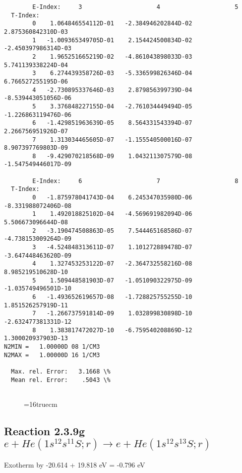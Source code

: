 \documentclass[12pt,dvipdfmx]{article}
\begin{document}
{\begin{small}
\begin{verbatim}
        E-Index:     3                     4                     5
  T-Index:
        0    1.064846554112D-01   -2.384946202844D-02    2.875360842310D-03
        1   -1.009365349705D-01    2.154424500834D-02   -2.450397986314D-03
        2    1.965251665219D-02   -4.861043898033D-03    5.741139338224D-04
        3    6.274439358726D-03   -5.336599826346D-04    6.766527255195D-06
        4   -2.730895337646D-03    2.879856399739D-04   -8.539443051056D-06
        5    3.376848227155D-04   -2.761034449494D-05   -1.226863119476D-06
        6   -1.429851963639D-05    8.564331543394D-07    2.266756951926D-07
        7    1.313034465605D-07   -1.155540500016D-07    8.907397769803D-09
        8   -9.429070218568D-09    1.043211307579D-08   -1.547549446017D-09

        E-Index:     6                     7                     8
  T-Index:
        0   -1.875978041743D-04    6.245347035980D-06   -8.331988072406D-08
        1    1.492018825102D-04   -4.569691982094D-06    5.506673096644D-08
        2   -3.190474508863D-05    7.544465168586D-07   -4.738153009264D-09
        3   -4.524848313611D-07    1.101272889478D-07   -3.647448463620D-09
        4    1.327453253122D-07   -2.364732558216D-08    8.985219510628D-10
        5    1.509448581903D-07   -1.051090322975D-09   -1.035749496501D-10
        6   -1.493652619657D-08   -1.728825755255D-10    1.851526257919D-11
        7   -1.266737591814D-09    1.032899830898D-10   -2.632477381331D-12
        8    1.383817472027D-10   -6.759540208869D-12    1.300020937903D-13
N2MIN =   1.00000D 08 1/CM3
N2MAX =   1.00000D 16 1/CM3

  Max. rel. Error:   3.1668 \%
  Mean rel. Error:    .5043 \%


\end{verbatim}\end{small}
\begin{figure} \label{2.3.9f}
\epsfxsize=16truecm
\end{figure}
\newpage

\subsection{
Reaction 2.3.9g $ e + He(1s^12s^11S;r) \rightarrow e + He(1s^12s^13S;r) $
}
Exotherm by -20.614 + 19.818 eV = -0.796 eV



\begin{small}\begin{verbatim}



\end{verbatim}
\end{small}}
\end{document}
